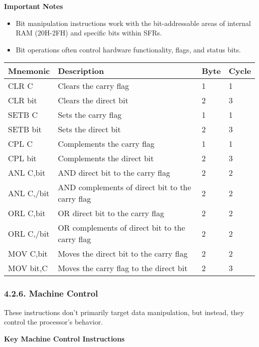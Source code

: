 \documentclass[
]{article}
\begin{document}
\textbf{Important Notes}

\begin{itemize}
\item
  Bit manipulation instructions work with the bit-addressable areas of
  internal RAM (20H-2FH) and specific bits within SFRs.
\item
  Bit operations often control hardware functionality, flags, and status
  bits.
\end{itemize}

\begin{longtable}[]{@{}llll@{}}
\toprule
\textbf{Mnemonic} & \textbf{Description} & \textbf{Byte} &
\textbf{Cycle} \\
\midrule
\endhead
CLR C & Clears the carry flag & 1 & 1 \\
CLR bit & Clears the direct bit & 2 & 3 \\
SETB C & Sets the carry flag & 1 & 1 \\
SETB bit & Sets the direct bit & 2 & 3 \\
CPL C & Complements the carry flag & 1 & 1 \\
CPL bit & Complements the direct bit & 2 & 3 \\
ANL C,bit & AND direct bit to the carry flag & 2 & 2 \\
ANL C,/bit & AND complements of direct bit to the carry flag & 2 & 2 \\
ORL C,bit & OR direct bit to the carry flag & 2 & 2 \\
ORL C,/bit & OR complements of direct bit to the carry flag & 2 & 2 \\
MOV C,bit & Moves the direct bit to the carry flag & 2 & 2 \\
MOV bit,C & Moves the carry flag to the direct bit & 2 & 3 \\
\bottomrule
\end{longtable}

\hypertarget{426-machine-control}{%
\subsubsection{4.2.6. Machine Control}\label{426-machine-control}}

These instructions don't primarily target data manipulation, but
instead, they control the processor's behavior.

\textbf{Key Machine Control Instructions}
\end{document}
